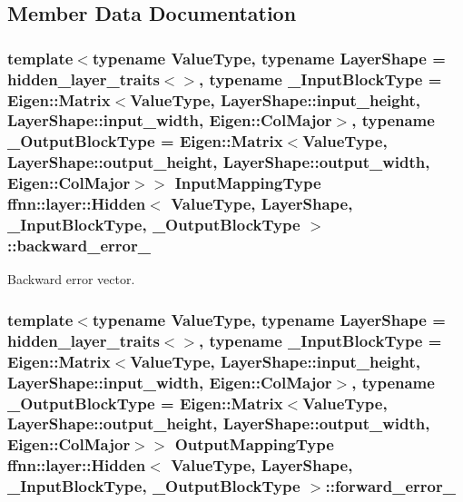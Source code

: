 \subsection{Member Data Documentation}
\hypertarget{classffnn_1_1layer_1_1_hidden_a94312439d5029c9c779ff778f18f95a8}{
\subsubsection[{backward\-\_\-error\-\_\-}]{\setlength{\rightskip}{0pt plus 5cm}template$<$typename Value\-Type, typename Layer\-Shape = hidden\-\_\-layer\-\_\-traits$<$$>$, typename \-\_\-\-Input\-Block\-Type = Eigen\-::\-Matrix$<$\-Value\-Type, Layer\-Shape\-::input\-\_\-height,  Layer\-Shape\-::input\-\_\-width,  Eigen\-::\-Col\-Major$>$, typename \-\_\-\-Output\-Block\-Type = Eigen\-::\-Matrix$<$\-Value\-Type, Layer\-Shape\-::output\-\_\-height, Layer\-Shape\-::output\-\_\-width, Eigen\-::\-Col\-Major$>$$>$ {\bf Input\-Mapping\-Type} {\bf ffnn\-::layer\-::\-Hidden}$<$ Value\-Type, Layer\-Shape, \-\_\-\-Input\-Block\-Type, \-\_\-\-Output\-Block\-Type $>$\-::backward\-\_\-error\-\_\-\hspace{0.3cm}{\ttfamily [protected]}}}\label{classffnn_1_1layer_1_1_hidden_a94312439d5029c9c779ff778f18f95a8}


Backward error vector. 

\hypertarget{classffnn_1_1layer_1_1_hidden_af1f439bdd3645a5ee444455d822b5143}{
\subsubsection[{forward\-\_\-error\-\_\-}]{\setlength{\rightskip}{0pt plus 5cm}template$<$typename Value\-Type, typename Layer\-Shape = hidden\-\_\-layer\-\_\-traits$<$$>$, typename \-\_\-\-Input\-Block\-Type = Eigen\-::\-Matrix$<$\-Value\-Type, Layer\-Shape\-::input\-\_\-height,  Layer\-Shape\-::input\-\_\-width,  Eigen\-::\-Col\-Major$>$, typename \-\_\-\-Output\-Block\-Type = Eigen\-::\-Matrix$<$\-Value\-Type, Layer\-Shape\-::output\-\_\-height, Layer\-Shape\-::output\-\_\-width, Eigen\-::\-Col\-Major$>$$>$ {\bf Output\-Mapping\-Type} {\bf ffnn\-::layer\-::\-Hidden}$<$ Value\-Type, Layer\-Shape, \-\_\-\-Input\-Block\-Type, \-\_\-\-Output\-Block\-Type $>$\-::forward\-\_\-error\-\_\-\hspace{0.3cm}{\ttfamily [protected]}}}\label{classffnn_1_1layer_1_1_hidden_af1f439bdd3645a5ee444455d822b5143}


